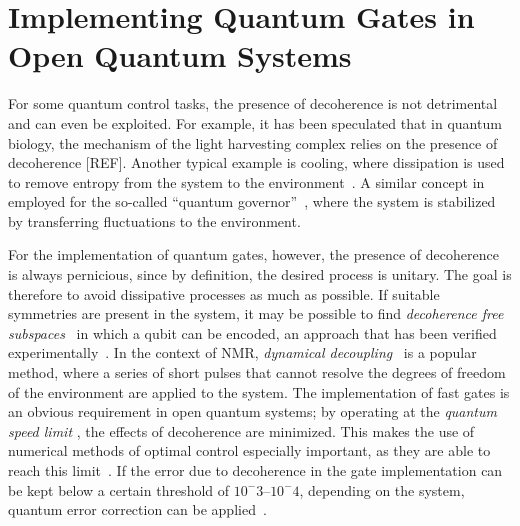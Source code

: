 \section{Implementing Quantum Gates in Open Quantum Systems}
\label{sec:quantum_counter_decoherence}

For some quantum control tasks, the presence of decoherence is not detrimental
and can even be exploited. For example, it has been speculated that in quantum
biology, the mechanism of the light harvesting complex relies on the presence
of decoherence [REF]. %
Another typical example is cooling, where dissipation is
used to remove entropy from the system to the environment~\cite{BartanaJCP93}.
A similar concept in employed for the so-called ``quantum
governor''~\cite{KallushPRA06}, where the system is stabilized by transferring
fluctuations to the environment.

For the implementation of quantum gates, however, the presence of decoherence is
always pernicious, since by definition, the desired process is unitary. The goal
is therefore to avoid dissipative processes as much as possible. If suitable
symmetries are present in the system, it may be possible to find
\emph{decoherence free subspaces}~\cite{LidarPRL1998}
%
in which a qubit can be encoded, an approach that has been verified
experimentally~\cite{ViolaS2001}. In the context of NMR,
\emph{dynamical decoupling}~\cite{ViolaPRL1999} is a popular method, where
%
a series of short pulses that cannot resolve the degrees of freedom of the
environment are applied to the system.
The implementation of fast gates is an obvious requirement in open quantum
systems; by operating at the \emph{quantum speed limit}
\cite{CampoPRL2013,DeffnerPRL2013,LevitinPRL2009,MargolusPD1998,BhattacharyyaJPA1983},
%
the effects of decoherence are minimized. This makes the use of numerical
methods of optimal control especially important, as they are able to reach this
limit~\cite{CanevaPRL09, GoerzJPB11}.
If the error due to decoherence in the gate implementation can be kept below
a certain threshold of $10^-3$--$10^-4$, depending on the system, quantum error
correction can be applied~\cite[and references therein]{DevittRPP2013}.


